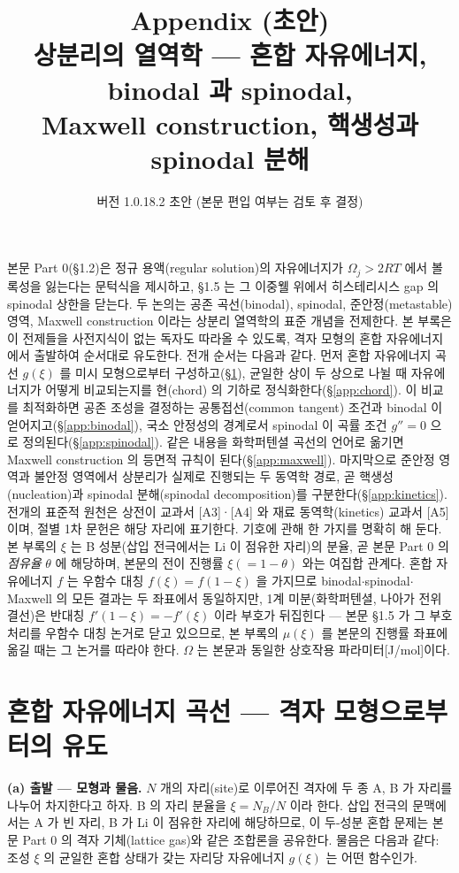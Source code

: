 \documentclass[11pt,a4paper]{article}
\title{\textbf{\LARGE Appendix (초안)}\\[0.35em]\Large 상분리의 열역학 --- 혼합 자유에너지, binodal 과 spinodal,\\ Maxwell construction, 핵생성과 spinodal 분해}
\author{}
\date{\normalsize 버전 1.0.18.2 초안 \quad(본문 편입 여부는 검토 후 결정)}
\begin{document}
\maketitle

본문 Part 0(\S1.2)은 정규 용액(regular solution)의 자유에너지가 $\Omega_j>2RT$ 에서 볼록성을 잃는다는
문턱식을 제시하고, \S1.5 는 그 이중웰 위에서 히스테리시스 gap 의 spinodal 상한을 닫는다. 두 논의는
공존 곡선(binodal), spinodal, 준안정(metastable) 영역, Maxwell construction 이라는 상분리 열역학의
표준 개념을 전제한다. 본 부록은 이 전제들을 사전지식이 없는 독자도 따라올 수 있도록, 격자 모형의
혼합 자유에너지에서 출발하여 순서대로 유도한다. 전개 순서는 다음과 같다. 먼저 혼합 자유에너지
곡선 $g(\xi)$ 를 미시 모형으로부터 구성하고(\S\ref{app:mixfe}), 균일한 상이 두 상으로 나뉠 때
자유에너지가 어떻게 비교되는지를 현(chord) 의 기하로 정식화한다(\S\ref{app:chord}). 이 비교를
최적화하면 공존 조성을 결정하는 공통접선(common tangent) 조건과 binodal 이 얻어지고(\S\ref{app:binodal}),
국소 안정성의 경계로서 spinodal 이 곡률 조건 $g''=0$ 으로 정의된다(\S\ref{app:spinodal}).
같은 내용을 화학퍼텐셜 곡선의 언어로 옮기면 Maxwell construction 의 등면적 규칙이
된다(\S\ref{app:maxwell}). 마지막으로 준안정 영역과 불안정 영역에서 상분리가 실제로 진행되는 두
동역학 경로, 곧 핵생성(nucleation)과 spinodal 분해(spinodal decomposition)를
구분한다(\S\ref{app:kinetics}). 전개의 표준적 원천은 상전이 교과서 [A3]·[A4] 와 재료 동역학(kinetics) 교과서
[A5] 이며, 절별 1차 문헌은 해당 자리에 표기한다. 기호에 관해 한 가지를 명확히 해 둔다. 본 부록의 $\xi$ 는 B 성분(삽입
전극에서는 Li 이 점유한 자리)의 분율, 곧 본문 Part 0 의 \emph{점유율} $\theta$ 에 해당하며, 본문의 전이
진행률 $\xi(=1-\theta)$ 와는 여집합 관계다. 혼합 자유에너지 $f$ 는 우함수 대칭 $f(\xi)=f(1-\xi)$ 을
가지므로 binodal$\cdot$spinodal$\cdot$Maxwell 의 모든 결과는 두 좌표에서 동일하지만, 1계
미분(화학퍼텐셜, 나아가 전위 결선)은 반대칭 $f'(1-\xi)=-f'(\xi)$ 이라 부호가 뒤집힌다 --- 본문
\S1.5 가 그 부호 처리를 우함수 대칭 논거로 닫고 있으므로, 본 부록의 $\mu(\xi)$ 를 본문의 진행률 좌표에
옮길 때는 그 논거를 따라야 한다. $\Omega$ 는 본문과 동일한 상호작용 파라미터[J/mol]이다.

\section{혼합 자유에너지 곡선 --- 격자 모형으로부터의 유도}\label{app:mixfe}

\textbf{(a) 출발 --- 모형과 물음.} $N$ 개의 자리(site)로 이루어진 격자에 두 종 A, B 가 자리를 나누어
차지한다고 하자. B 의 자리 분율을 $\xi=N_B/N$ 이라 한다. 삽입 전극의 문맥에서는 A 가 빈 자리, B 가
Li 이 점유한 자리에 해당하므로, 이 두-성분 혼합 문제는 본문 Part 0 의 격자 기체(lattice gas)와 같은
조합론을 공유한다. 물음은 다음과 같다: 조성 $\xi$ 의 균일한 혼합 상태가 갖는 자리당 자유에너지
$g(\xi)$ 는 어떤 함수인가.
\end{document}
